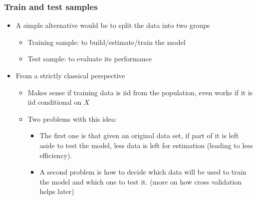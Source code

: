 \documentclass[
  shownotes,
  xcolor={svgnames},
  hyperref={colorlinks,citecolor=DarkBlue,linkcolor=DarkRed,urlcolor=DarkBlue}
  , aspectratio=169]{beamer}
\begin{document}
\begin{frame}
\frametitle{Train and test samples}

\begin{itemize}
  \item A simple alternative would be to split the data into two groups
  \begin{itemize}
    \item  Training sample: to build/estimate/train the model
    \medskip
    \item  Test sample:  to evaluate its performance 
  \end{itemize}

\bigskip
\item From a strictly classical perspective 
\begin{itemize}
  \item Makes sense if training data is iid from the population, even works if it is iid conditional on $X$
  \medskip
  \item Two problems with this idea:
  \begin{itemize}
    \item  The first one is that given an original data set, if part of it is left aside to test the model, less data is left for estimation (leading to less efficiency). 
    \item A second problem is how to decide which data will be used to train the model and which one to test it. {\tiny (more on how cross validation helps later)}
  \end{itemize}
\end{itemize}


 \end{itemize}


\end{frame}
\end{document}
